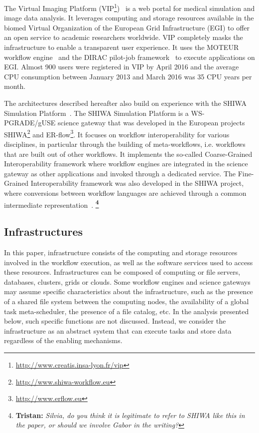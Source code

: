 \documentclass[preprint,3p,twocolumn]{elsarticle}
\newcommand{\note}[2]{\textbf{\Large{\color{blue}\footnote{{\color{blue}\textbf{#1:} \textit{#2}\color{black}}}}}}
\begin{document}
The Virtual Imaging Platform
(VIP\footnote{\url{http://www.creatis.insa-lyon.fr/vip}})~\cite{GLAT-13}
is a web portal for medical simulation and image data analysis. It
leverages computing and storage resources available in the biomed
Virtual Organization of the European Grid Infrastructure (EGI) to
offer an open service to academic researchers worldwide. VIP
completely masks the infrastructure to enable a transparent user
experience. It uses the MOTEUR workflow engine~\cite{GLAT-13} and the
DIRAC pilot-job framework~\cite{tsaregorodtsev2008dirac} to execute
applications on EGI. Almost 900 users were registered in VIP by
April 2016 and the average CPU consumption between January 2013 and
March 2016 was 35 CPU years per month.

The architectures described hereafter also build on experience with
the SHIWA Simulation Platform~\cite{terstyanszky2014enabling}. The
SHIWA Simulation Platform is a WS-PGRADE/gUSE science gateway that was
developed in the European projects
SHIWA\footnote{\url{http://www.shiwa-workflow.eu}} and
ER-flow\footnote{\url{http://www.erflow.eu}}. It focuses on workflow
interoperability for various disciplines, in particular through the
building of meta-workflows, i.e. workflows that are built out of other
workflows. It implements the so-called Coarse-Grained Interoperability
framework where workflow engines are integrated in the science gateway
as other applications and invoked through a dedicated service. The
Fine-Grained Interoperability framework was also developed in the
SHIWA project, where conversions between workflow languages are
achieved through a common intermediate
representation~\cite{plankensteiner-prodan-etal:2013}. \note{Tristan}{Silvia,
  do you think it is legitimate to refer to SHIWA like this in the
  paper, or should we involve Gabor in the writing?}

\subsection{Infrastructures}

In this paper, infrastructure consists of the computing and storage
resources involved in the workflow execution, as well as the software
services used to access these resources. Infrastructures can be composed of
computing or file servers, databases, clusters, grids or clouds. Some
workflow engines and science gateways may assume specific
characteristics about the infrastructure, such as the presence of a
shared file system between the computing nodes, the availability of a
global task meta-scheduler, the presence of a file catalog, etc. In
the analysis presented below, such specific functions are not
discussed. Instead, we consider the infrastructure as an abstract
system that can execute tasks and store data regardless of the
enabling mechanisms.
\end{document}
